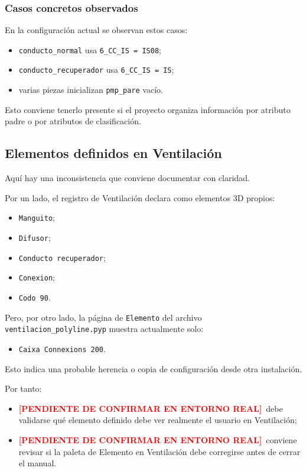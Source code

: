 \documentclass[12pt,a4paper]{article}
\newcommand{\pendingtag}{\textcolor{red}{\textbf{[PENDIENTE DE CONFIRMAR EN ENTORNO REAL]}}}
\begin{document}
\subsubsection{Casos concretos observados}

En la configuración actual se observan estos casos:

\begin{itemize}
\item \texttt{conducto\_normal} usa \texttt{6\_CC\_IS = IS08};
\item \texttt{conducto\_recuperador} usa \texttt{6\_CC\_IS = IS};
\item varias piezas inicializan \texttt{pmp\_pare} vacío.
\end{itemize}

Esto conviene tenerlo presente si el proyecto organiza información por atributo padre o por atributos de clasificación.

\subsection{Elementos definidos en Ventilación}

Aquí hay una inconsistencia que conviene documentar con claridad.

Por un lado, el registro de Ventilación declara como elementos 3D propios:

\begin{itemize}
\item \texttt{Manguito};
\item \texttt{Difusor};
\item \texttt{Conducto recuperador};
\item \texttt{Conexion};
\item \texttt{Codo 90}.
\end{itemize}

Pero, por otro lado, la página de \texttt{Elemento} del archivo \texttt{ventilacion\_polyline.pyp} muestra actualmente solo:

\begin{itemize}
\item \texttt{Caixa Connexions 200}.
\end{itemize}

Esto indica una probable herencia o copia de configuración desde otra instalación.

Por tanto:

\begin{itemize}
\item \pendingtag\ debe validarse qué elemento definido debe ver realmente el usuario en Ventilación;
\item \pendingtag\ conviene revisar si la paleta de Elemento en Ventilación debe corregirse antes de cerrar el manual.
\end{itemize}
\end{document}
